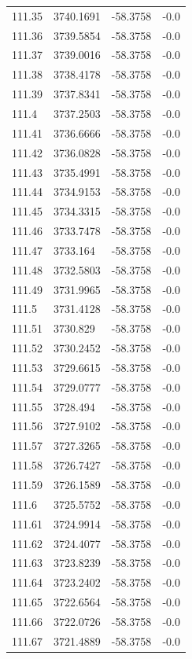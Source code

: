 \begin{table}[H]
\begin{tabular}{llll}
111.35 & 3740.1691 & -58.3758 & -0.0 \\
111.36 & 3739.5854 & -58.3758 & -0.0 \\
111.37 & 3739.0016 & -58.3758 & -0.0 \\
111.38 & 3738.4178 & -58.3758 & -0.0 \\
111.39 & 3737.8341 & -58.3758 & -0.0 \\
111.4 & 3737.2503 & -58.3758 & -0.0 \\
111.41 & 3736.6666 & -58.3758 & -0.0 \\
111.42 & 3736.0828 & -58.3758 & -0.0 \\
111.43 & 3735.4991 & -58.3758 & -0.0 \\
111.44 & 3734.9153 & -58.3758 & -0.0 \\
111.45 & 3734.3315 & -58.3758 & -0.0 \\
111.46 & 3733.7478 & -58.3758 & -0.0 \\
111.47 & 3733.164 & -58.3758 & -0.0 \\
111.48 & 3732.5803 & -58.3758 & -0.0 \\
111.49 & 3731.9965 & -58.3758 & -0.0 \\
111.5 & 3731.4128 & -58.3758 & -0.0 \\
111.51 & 3730.829 & -58.3758 & -0.0 \\
111.52 & 3730.2452 & -58.3758 & -0.0 \\
111.53 & 3729.6615 & -58.3758 & -0.0 \\
111.54 & 3729.0777 & -58.3758 & -0.0 \\
111.55 & 3728.494 & -58.3758 & -0.0 \\
111.56 & 3727.9102 & -58.3758 & -0.0 \\
111.57 & 3727.3265 & -58.3758 & -0.0 \\
111.58 & 3726.7427 & -58.3758 & -0.0 \\
111.59 & 3726.1589 & -58.3758 & -0.0 \\
111.6 & 3725.5752 & -58.3758 & -0.0 \\
111.61 & 3724.9914 & -58.3758 & -0.0 \\
111.62 & 3724.4077 & -58.3758 & -0.0 \\
111.63 & 3723.8239 & -58.3758 & -0.0 \\
111.64 & 3723.2402 & -58.3758 & -0.0 \\
111.65 & 3722.6564 & -58.3758 & -0.0 \\
111.66 & 3722.0726 & -58.3758 & -0.0 \\
111.67 & 3721.4889 & -58.3758 & -0.0 \\

\end{tabular}
\end{table}
